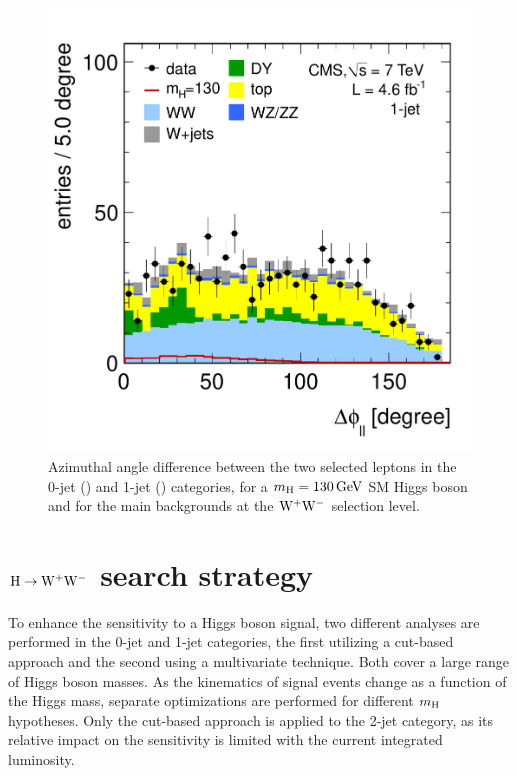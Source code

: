 \documentclass[11pt,twoside,a4paper,cmspaper,final,collab]{cms-tdr}
\begin{document}
\begin{figure}[htbp]
\begin{center}
  \includegraphics[width=\cmsFigWidth]{ww_1j_deltaphill}
	 \caption{Azimuthal angle difference between the two selected leptons
	 in the 0-jet (\cmsLeft) and 1-jet (\cmsRight) categories,
       for a $m_{\mathrm{H}}= 130\,\text{Ge\hspace{-.08em}V}$ SM Higgs boson and for the main
       backgrounds at the $\mathrm{W^+}{}\mathrm{W^-}$ selection level.}  \label{fig:deltaphi}
\end{center}
\end{figure}

\section{\texorpdfstring{$\mathrm{H} \to \mathrm{W^+}{}\mathrm{W^-}$}{Higgs to WW} search strategy}
\label{sec:hww}

To enhance the sensitivity to a Higgs boson signal, two different analyses are
performed in the 0-jet and 1-jet categories, the first utilizing
a cut-based approach and the second using a multivariate
technique. Both cover a large range of Higgs boson masses.
As the kinematics of signal events change as a function of the Higgs mass,
separate optimizations are performed for different $m_{\mathrm{H}}$ hypotheses.
Only the cut-based approach is applied to the 2-jet category,
as its relative impact on the sensitivity is limited with the current integrated luminosity.
\end{document}
